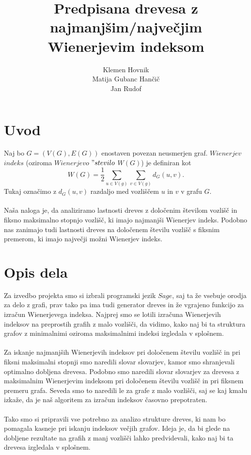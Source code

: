 \documentclass[a4paper]{article}
\title{Predpisana drevesa z najmanjšim/največjim Wienerjevim indeksom}
\author{Klemen Hovnik\\ Matija Gubanc Hančič \\ Jan Rudof}
\begin{document}
\maketitle

\section{Uvod}

Naj bo $G=(V(G),  E(G))$ enostaven povezan neusmerjen graf. $Wienerjev$ $ indeks$ (oziroma $Wienerjevo$  $"stevilo$ $ W(G)$) je definiran kot
\begin{equation}
W(G) = \frac{1}{2}\sum_{u\in V(g)}\sum_{v\in V(g)} d_G(u,v).
\end{equation}
Tukaj označimo z $d_G(u,v)$ razdaljo med vozliščem $u$ in $v$ v grafu $G$. 
\\
\\
Naša naloga je, da analiziramo lastnosti dreves z določenim številom vozlišč in 
fiksno maksimalno stopnjo vozlišč, ki imajo najmanjši Wienerjev indeks. Podobno nas zanimajo tudi lastnosti 
dreves na določenem številu vozlišč s fiksnim premerom, ki imajo največji možni Wienerjev indeks.

\section{Opis dela}

Za izvedbo projekta smo si izbrali programski jezik $Sage$, saj ta že vsebuje orodja za delo z grafi, prav tako 
pa ima tudi generator dreves in že vgrajeno funkcijo za izračun Wienerjevega indeksa. Najprej smo se lotili 
izračuna Wienerjevih indeksov na preprostih grafih z malo vozlišči, da vidimo, kako naj bi ta struktura grafov 
z minimalnimi oziroma maksimalnimi indeksi izgledala v splošnem. 
\\
\\
Za iskanje najmanjših Wienerjevih indeksov pri določenem številu vozlišč in pri fiksni maksimalni stopnji 
smo naredili slovar slovarjev, kamor smo shranjevali optimalno dobljena drevesa. Podobno smo naredili 
slovar slovarjev za drevesa z maksimalnim Wienerjevim indeksom pri določenem številu vozlišč in pri 
fiksnem premeru grafa. Seveda smo to naredili le za grafe z malo vozlišči, saj se kaj kmalu izkaže, da je 
naš algoritem za izračun indeksov časovno prepotraten.
\\
\\
Tako smo si pripravili vse potrebno za analizo strukture dreves, ki nam bo pomagala kasneje pri iskanju 
indeksov večjih grafov. Ideja je, da bi glede na dobljene rezultate na grafih z manj vozlišči lahko predvidevali,
kako naj bi ta drevesa izgledala v splošnem.
\end{document}
